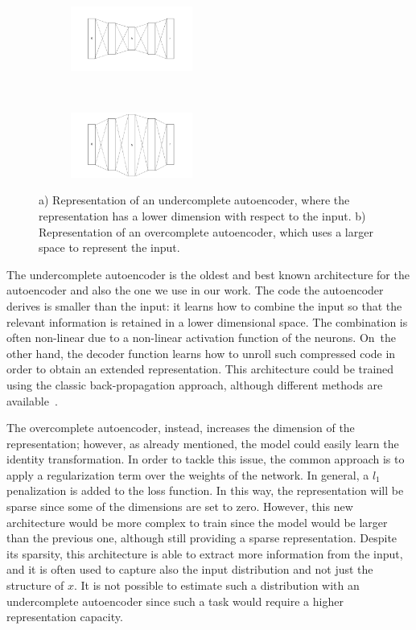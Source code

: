 \begin{figure}[h]
\centering
    \begin{subfigure}[h]{5cm}
        \centering
        \includegraphics[width=4cm]{images/05-modeling/undercomplete_autoencoder}
        \caption{}
        \label{fig:undercomplete}
    \end{subfigure}
    ~
    \begin{subfigure}[h]{5cm}
        \centering
        \includegraphics[width=4cm]{images/05-modeling/overcomplete_autoencoder}
        \caption{}
        \label{fig:overcomplete}
    \end{subfigure}  \vspace{-6pt}
    \caption{a) Representation of an undercomplete autoencoder, where the representation has a lower dimension with respect to the input. b) Representation of an overcomplete autoencoder, which uses a larger space to represent the input.}
    \label{fig:under_over_autoencoder}
\end{figure}

The undercomplete autoencoder is the oldest and best known architecture for the autoencoder and also the one we use in our work. The code the autoencoder derives is smaller than the input: it learns how to combine the input so that the relevant information is retained in a lower dimensional space. The combination is often non-linear due to a non-linear activation function of the neurons. On~the other hand, the decoder function learns how to unroll such compressed code in order to obtain an extended representation. This architecture could be trained using the classic back-propagation approach, although different methods are available~\citep{goodfellow_deep_2016}.

The overcomplete autoencoder, instead, increases the dimension of the representation; however, as already mentioned, the model could easily learn the identity transformation. In order to tackle this issue, the common approach is to apply a regularization term over the weights of the network. In general, a $l_1$ penalization is added to the loss function.
In this way, the representation will be sparse since some of the dimensions are set to zero.
However, this new architecture would be more complex to train since the model would be larger than the previous one, although still providing a sparse representation. Despite its sparsity, this architecture is able to extract more information from the input, and it is often used to capture also the input distribution and not just the structure of $x$. It is not possible to estimate such a distribution with an undercomplete autoencoder since such a task would require a higher representation capacity.

